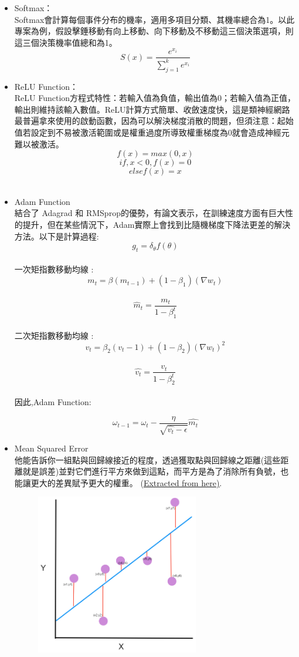 \documentclass[14pt,a4paper]{report}  %
\begin{document}
\begin{itemize}
\item Softmax：\\
Softmax會計算每個事件分布的機率，適用多項目分類、其機率總合為1。以此專案為例，假設擊錘移動有向上移動、向下移動及不移動這三個決策選項，則這三個決策機率值總和為1。\\[12pt]
$$S(x)=\frac{e^{x_i}}{\sum^k_{j=1}e^{x_i}}$$
\item ReLU Function：\\
ReLU Function方程式特性：若輸入值為負值，輸出值為0；若輸入值為正值，輸出則維持該輸入數值。ReLU計算方式簡單、收斂速度快，這是類神經網路最普遍拿來使用的啟動函數，因為可以解決梯度消散的問題，但須注意：起始值若設定到不易被激活範圍或是權重過度所導致權重梯度為0就會造成神經元難以被激活。
$$f(x)=max(0,x)$$
$$if , x<0 , f(x)=0$$
$$else f(x)=x$$\\
\item Adam Function\\
結合了 Adagrad 和 RMSprop的優勢，有論文表示，在訓練速度方面有巨大性的提升，但在某些情況下，Adam實際上會找到比隨機梯度下降法更差的解決方法。以下是計算過程: \\[6pt]
$$g_t=\delta_{\theta}f(\theta)$$\\
一次矩指數移動均線 :\\[6pt]
 $$m_t =\beta(m_{t-1})+(1-\beta_1)(\nabla{w_t})$$\\
$$\hat m_t=\frac{m_t}{1-\beta_1^t}$$\\[6pt]
二次矩指數移動均線 :\\[6pt]
$$v_t=\beta_2(v_t-1)+(1-\beta_2)(\nabla{w_t})^2$$\\
$$\hat{v_t}=\frac{v_t}{1-\beta_2^t}$$\\
因此,Adam Function:\\[6pt]
\begin{Large}$$\omega_{t-1}=\omega_t-\frac{\eta}{\sqrt{\hat{v_t}-\epsilon}}\hat{m_t}$$\end{Large}
\item Mean Squared Error\\
他能告訴你一組點與回歸線接近的程度，透過獲取點與回歸線之距離(這些距離就是誤差)並對它們進行平方來做到這點，而平方是為了消除所有負號，也能讓更大的差異賦予更大的權重。
(\href{https://www.statisticshowto.com/mean-squared-error/}{\underline{Extracted from here)}}.\\[6pt]
\begin{figure}
\center
\includegraphics[height=7cm]{MSE}

\end{figure}
\end{itemize}
\end{document}
